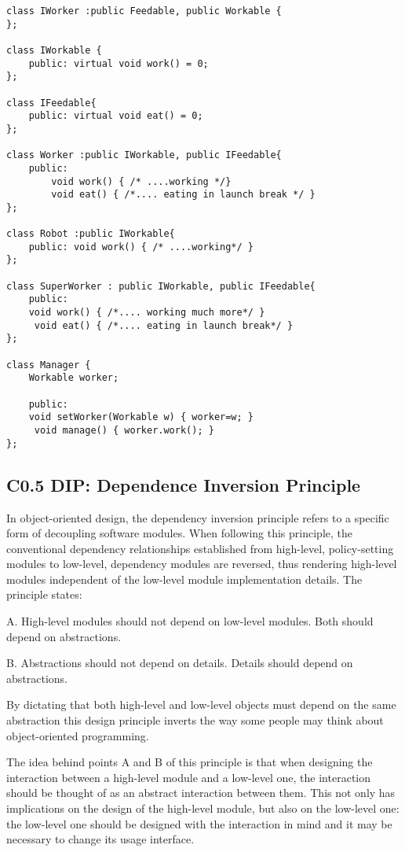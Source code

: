 \documentclass{book}
\begin{document}
\begin{lstlisting}[caption={interface segregation principle - good example}]
class IWorker :public Feedable, public Workable {
};

class IWorkable {
    public: virtual void work() = 0;
};

class IFeedable{
    public: virtual void eat() = 0;
};

class Worker :public IWorkable, public IFeedable{
    public:
        void work() { /* ....working */}
	    void eat() { /*.... eating in launch break */ }
};

class Robot :public IWorkable{
    public: void work() { /* ....working*/ }
};

class SuperWorker : public IWorkable, public IFeedable{
    public:
    void work() { /*.... working much more*/ }
	 void eat() { /*.... eating in launch break*/ }
};

class Manager {
	Workable worker;

    public:
    void setWorker(Workable w) { worker=w; }
	 void manage() { worker.work(); }
};
\end{lstlisting}

\subsection{C0.5 DIP: Dependence Inversion Principle}
In object-oriented design, the dependency inversion principle refers to a specific form of decoupling software modules.
When following this principle, the conventional dependency relationships established from high-level, policy-setting modules to low-level,
dependency modules are reversed, thus rendering high-level modules independent of the low-level module implementation details. The principle states:

        A. High-level modules should not depend on low-level modules. Both should depend on abstractions.

        B. Abstractions should not depend on details. Details should depend on abstractions.

By dictating that both high-level and low-level objects must depend on the same abstraction this design principle inverts the way some people may think about object-oriented programming.

The idea behind points A and B of this principle is that when designing the interaction between a high-level module and a low-level one, the interaction should be thought of
as an abstract interaction between them.  This not only has implications on the design of the high-level module, but also on the low-level one:
the low-level one should be designed with the interaction in mind and it may be necessary to change its usage interface.
\end{document}
